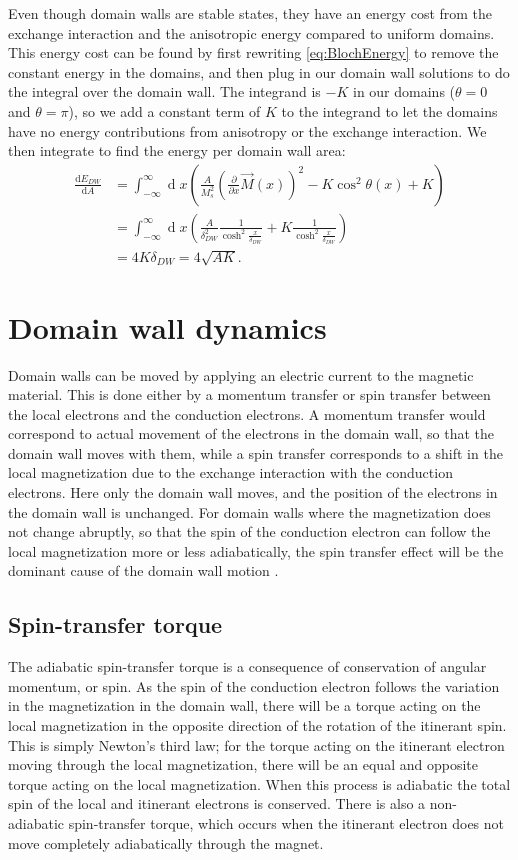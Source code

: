 \documentclass[12pt, a4paper, twoside, openright]{article}		%
\let\oldsection\section
\def\section{\cleardoublepage\oldsection}
\renewcommand{\d}[1]{\ensuremath{\operatorname{d}\!{#1}}}
\numberwithin{equation}{section}
\begin{document}
Even though domain walls are stable states, they have an energy cost from the exchange interaction and the anisotropic energy compared to uniform domains. This energy cost can be found by first rewriting \eqref{eq:BlochEnergy} to remove the constant energy in the domains, and then plug in our domain wall solutions to do the integral over the domain wall. The integrand is $-K$ in our domains ($\theta = 0$ and $\theta = \pi$), so we add a constant term of $K$ to the integrand to let the domains have no energy contributions from anisotropy or the exchange interaction. We then integrate to find the energy per domain wall area:
\begin{align}
\nonumber\frac{\textrm{d} E_{DW}}{\textrm{d} A} &= \int_{-\infty}^{\infty} \d x \left(\frac{A}{M_s^2}(\frac{\partial}{\partial x}\vec{M}(x))^2 - K \cos ^2 \theta (x) + K\right) \\
\nonumber&= \int_{-\infty}^{\infty} \d x \left(\frac{A}{\delta_{DW}^2}\frac{1}{\cosh^2\frac{x}{\delta_{DW}}} + K \frac{1}{\cosh^2\frac{x}{\delta_{DW}}}\right) \\
&= 4K\delta_{DW} = 4\sqrt{AK}.
\end{align}

\section{Domain wall dynamics} \label{sec:DWDynamics}
Domain walls can be moved by applying an electric current to the magnetic material. This is done either by a momentum transfer or spin transfer between the local electrons and the conduction electrons. A momentum transfer would correspond to actual movement of the electrons in the domain wall, so that the domain wall moves with them, while a spin transfer corresponds to a shift in the local magnetization due to the exchange interaction with the conduction electrons. Here only the domain wall moves, and the position of the electrons in the domain wall is unchanged. For domain walls where the magnetization does not change abruptly, so that the spin of the conduction electron can follow the local magnetization more or less adiabatically, the spin transfer effect will be the dominant cause of the domain wall motion \cite{KohnoTatara-04}. 

\subsection{Spin-transfer torque}
The adiabatic spin-transfer torque is a consequence of conservation of angular momentum, or spin. As the spin of the conduction electron follows the variation in the magnetization in the domain wall, there will be a torque acting on the local magnetization in the opposite direction of the rotation of the itinerant spin. This is simply Newton's third law; for the torque acting on the itinerant electron moving through the local magnetization, there will be an equal and opposite torque acting on the local magnetization. When this process is adiabatic the total spin of the local and itinerant electrons is conserved. There is also a non-adiabatic spin-transfer torque, which occurs when the itinerant electron does not move completely adiabatically through the magnet. 
\end{document}
